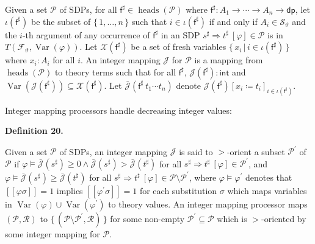 
Given a set $\mathcal{P}$ of SDPs, for all $\mathsf{f}^{\sharp}\in\operatorname{heads}(\mathcal{P})$ where $\mathsf{f}^{\sharp}:{A}_{1}\rightarrow\cdots\rightarrow{A}_{n}\rightarrow\mathsf{dp}$, let $\iota(\mathsf{f}^{\sharp})$ be the subset of $\{\,1,\ldots,n\,\}$ such that $i\in\iota(\mathsf{f}^{\sharp})$ if and only if $A_{i}\in{\mathcal{S}}_{\vartheta}$ and the $i$-th argument of any occurrence of $\mathsf{f}^{\sharp}$ in an SDP ${s^{\sharp}}\Rightarrow{t^{\sharp}}\ [\varphi]\in\mathcal{P}$ is in $T({\mathcal{F}}_{\vartheta},\operatorname{Var}(\varphi))$. Let $\mathcal{X}(\mathsf{f}^{\sharp})$ be a set of fresh variables $\{\,x_{i}\,|\,i\in\iota(\mathsf{f}^{\sharp})\,\}$ where $x_{i}:A_{i}$ for all $i$. An integer mapping $\mathcal{J}$ for $\mathcal{P}$ is a mapping from $\operatorname{heads}(\mathcal{P})$ to theory terms such that for all $\mathsf{f}^{\sharp}$, $\mathcal{J}(\mathsf{f}^{\sharp}):\mathsf{int}$ and $\operatorname{Var}(\mathcal{J}(\mathsf{f}^{\sharp}))\subseteq\mathcal{X}(\mathsf{f}^{\sharp})$. Let $\bar{\mathcal{J}}({\mathsf{f}^{\sharp}}\ {{t}_{1}\cdots{t}_{n}})$ denote $\mathcal{J}(\mathsf{f}^{\sharp})[{x_{i}}\coloneq{t_{i}}]_{i\in\iota(\mathsf{f}^{\sharp})}$.\par
 
 
 
 
Integer mapping processors handle decreasing integer values:\par
 
 
 
\par\medskip\noindent\textbf{Definition 20.}\par
 
 
Given a set $\mathcal{P}$ of SDPs, an integer mapping $\mathcal{J}$ is said to $>$-orient a subset $\mathcal{P}^{\prime}$ of $\mathcal{P}$ if $\varphi\models\bar{\mathcal{J}}(s^{\sharp})\geq 0\wedge\bar{\mathcal{J}}(s^{\sharp})>\bar{\mathcal{J}}(t^{\sharp})$ for all ${s^{\sharp}}\Rightarrow{t^{\sharp}}\ [\varphi]\in\mathcal{P}^{\prime}$, and $\varphi\models\bar{\mathcal{J}}(s^{\sharp})\geq\bar{\mathcal{J}}(t^{\sharp})$ for all ${s^{\sharp}}\Rightarrow{t^{\sharp}}\ [\varphi]\in\mathcal{P}\setminus\mathcal{P}^{\prime}$, where $\varphi\models\varphi^{\prime}$ denotes that $[\![\varphi\sigma]\!]=1$ implies $[\![\varphi^{\prime}\sigma]\!]=1$ for each substitution $\sigma$ which maps variables in $\operatorname{Var}(\varphi)\cup\operatorname{Var}(\varphi^{\prime})$ to theory values. An integer mapping processor maps $(\mathcal{P},\mathcal{R})$ to $\{\,(\mathcal{P}\setminus\mathcal{P}^{\prime},\mathcal{R})\,\}$ for some non-empty $\mathcal{P}^{\prime}\subseteq\mathcal{P}$ which is $>$-oriented by some integer mapping for $\mathcal{P}$.\par
 
